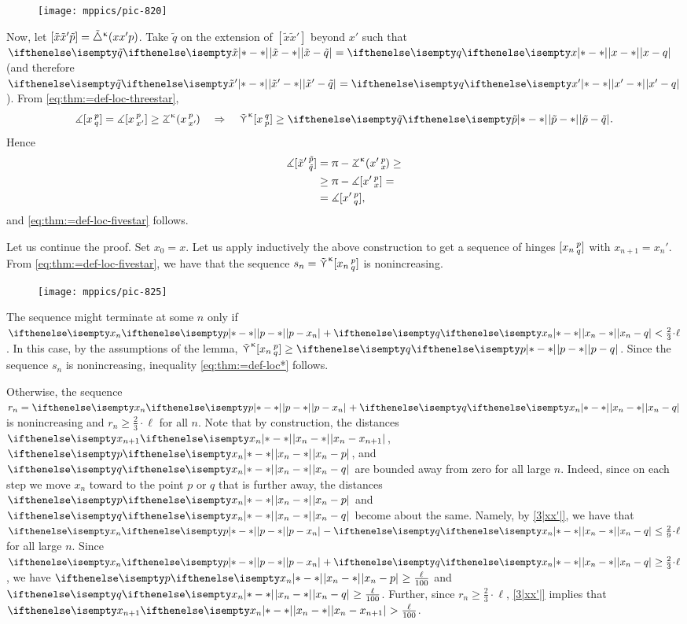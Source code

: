 {

\begin{wrapfigure}{r}{30 mm}
\vskip-8mm
\centering
\texttt{[image: mppics/pic-820]}
\vskip-4mm
\end{wrapfigure}

Now, let 
$[{\tilde x}{\tilde x'}{\tilde p}]={\tilde\triangle}^{\upkappa}(x x' p)$.
Take $\tilde  q$ on the extension of $[\tilde  x\tilde  x']$ beyond $x'$ such that $\dist{\tilde x}{\tilde q}{}=\dist{x}{q}{}$ (and therefore $\dist{\tilde x'}{\tilde q}{}=\dist{x'}{q}{}$).
From \ref{eq:thm:=def-loc-threestar},
\[\mangle\hinge x p q
=\mangle\hinge  x p{x'}\ge\angk\kappa x p{x'}\quad \Rightarrow\quad 
\side\kappa \hinge x q p\ge\dist{\tilde p}{\tilde q}{}.\]
Hence
\begin{align*}
\mangle\hinge{\tilde x'}{\tilde p}{\tilde q}&= 
\pi
-\angk\kappa{x'}p x
\ge
\\
&\ge
\pi-\mangle\hinge{x'}p x
=
\\
&=
\mangle\hinge{x'}p q,
\end{align*}
and \ref{eq:thm:=def-loc-fivestar} follows.

}

Let us continue the proof.
Set $x_0=x$.
Let us apply inductively the above construction to get a sequence of hinges  $[x_n\,{}^{p}_{q}]$ with $x_{n+1}=x_n'$.
From \ref{eq:thm:=def-loc-fivestar}, we have that the sequence  $s_n\z=\side\kappa \hinge{x_n}p q$ is nonincreasing.
\begin{figure}[ht!]
\centering
\texttt{[image: mppics/pic-825]}
\end{figure}

The sequence might terminate at some $n$ only if $\dist{p}{x_n}{}+\dist{x_n}{q}{}\z< \tfrac{2}{3}\cdot\ell $.
In this case, by the assumptions of the lemma, $\side\kappa \hinge{x_n}p q\ge\dist{p}{q}{}$.
Since the sequence $s_n$ is nonincreasing, inequality \ref{eq:thm:=def-loc*} follows.

Otherwise, the sequence $r_n=\dist{p}{x_n}{}+\dist{x_n}{q}{}$ is nonincreasing and $r_n\ge\tfrac{2}{3}\cdot\ell$ for all $n$.
Note that by construction, the distances
$\dist{x_n}{x_{n+1}}{}$, $\dist{x_n}{p}{}$, and $\dist{x_n}{q}{}$ are bounded away from zero for all large $n$.
Indeed, since on each step we move $x_n$ toward to the point $p$ or $q$ that is further away, the distances $\dist{x_n}{p}{}$ and $\dist{x_n}{q}{}$ become about the same.
Namely, by \ref{3|xx'|}, we have that $\dist{p}{x_n}{}-\dist{x_n}{q}{}\le \tfrac29\cdot\ell$ for all large $n$.
Since $\dist{p}{x_n}{}+\dist{x_n}{q}{}\ge \tfrac23\cdot\ell$, we have $\dist{x_n}{p}{}\ge \tfrac\ell{100}$ and $\dist{x_n}{q}{}\ge \tfrac\ell{100}$.
Further, since $r_n\ge\tfrac{2}{3}\cdot\ell$, \ref{3|xx'|} implies that $\dist{x_n}{x_{n+1}}{}>\tfrac\ell{100}$.


